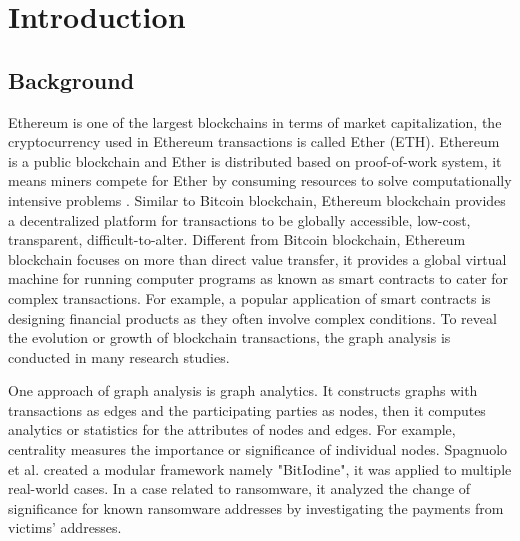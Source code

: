 %

\chapter{Introduction}
\label{sec:intro}



\section{Background}
\label{sec:intro:background}

Ethereum is one of the largest blockchains in terms of market capitalization, the cryptocurrency used in Ethereum transactions is called Ether (ETH). Ethereum is a public blockchain and Ether is distributed based on proof-of-work system, it means miners compete for Ether by consuming resources to solve computationally intensive problems \cite{1}. Similar to Bitcoin blockchain, Ethereum blockchain provides a decentralized platform for transactions to be globally accessible, low-cost, transparent, difficult-to-alter. Different from Bitcoin blockchain, Ethereum blockchain focuses on more than direct value transfer, it provides a global virtual machine for running computer programs as known as smart contracts to cater for complex transactions. For example, a popular application of smart contracts is designing financial products as they often involve complex conditions. To reveal the evolution or growth of blockchain transactions, the graph analysis is conducted in many research studies.

One approach of graph analysis is graph analytics. It constructs graphs with transactions as edges and the participating parties as nodes, then it computes analytics or statistics for the attributes of nodes and edges. For example, centrality measures the importance or significance of individual nodes. Spagnuolo et al. \cite{6} created a modular framework namely "BitIodine", it was applied to multiple real-world cases. In a case related to ransomware, it analyzed the change of significance for known ransomware addresses by investigating the payments from victims' addresses. 


